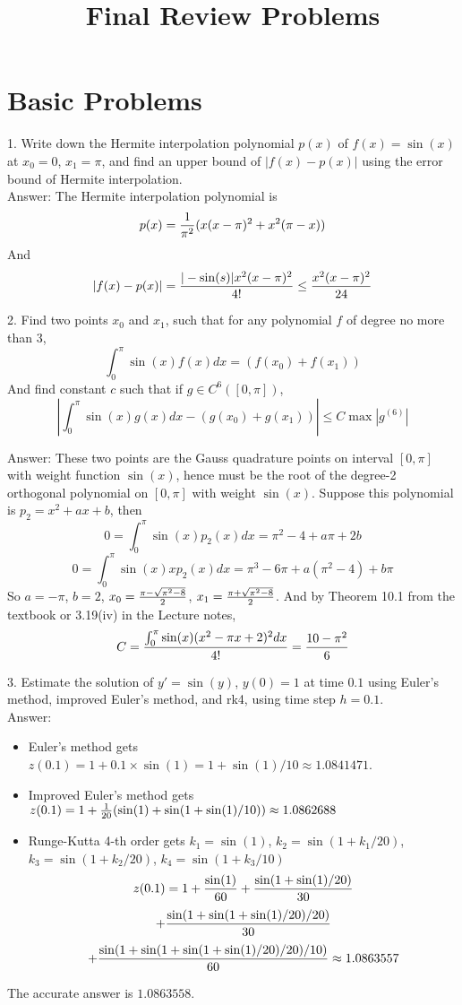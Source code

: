 \documentclass[20pt]{article} %
\title{Final Review Problems}
\theoremstyle{break}
\begin{document}
\maketitle


\section{Basic Problems}

1. Write down the Hermite interpolation polynomial $p(x)$ of $f(x)=\sin(x)$ at $x_0=0$, $x_1=\pi$, and find an upper bound of $|f(x)-p(x)|$ using the error bound of Hermite interpolation.\\

Answer: The Hermite interpolation polynomial is
\[p(x)={1\over \pi^2}(x(x-\pi)^2+x^2(\pi-x))\]
And
\[|f(x)-p(x)|={|-\sin(s)|x^2(x-\pi)^2\over 4!}\leq{x^2(x-\pi)^2\over 24}\]

2. Find two points $x_0$ and $x_1$, such that for any polynomial $f$ of degree no more than $3$,
\[\int_0^\pi\sin(x)f(x)dx=(f(x_0)+f(x_1))\]
And find constant $c$ such that if $g\in C^6([0, \pi])$,
\[|\int_0^\pi\sin(x)g(x)dx-(g(x_0)+g(x_1))|\leq C\max|g^{(6)}|\]

Answer: These two points are the Gauss quadrature points on interval $[0, \pi]$ with weight function $\sin(x)$, hence must be the root of the degree-2 orthogonal polynomial on $[0, \pi]$ with weight $\sin(x)$. Suppose this polynomial is $p_2=x^2+ax+b$, then
\[0=\int_0^\pi \sin(x)p_2(x)dx=\pi^2-4+a\pi+2b\]
\[0=\int_0^\pi \sin(x)xp_2(x)dx=\pi^3-6\pi+a(\pi^2-4)+b\pi\]
So $a=-\pi$, $b=2$, $x_0={\pi-\sqrt{\pi^2-8}\over 2}$, $x_1={\pi+\sqrt{\pi^2-8}\over 2}$.
And by Theorem 10.1 from the textbook or 3.19(iv) in the Lecture notes,
\[C={\int_0^\pi\sin(x)(x^2-\pi x+2)^2dx\over 4!}={10-\pi^2\over 6}\]

3. Estimate the solution of $y'=\sin(y)$, $y(0)=1$ at time $0.1$ using Euler's method, improved Euler's method, and rk4, using time step $h=0.1$. \\

Answer:
\begin{itemize}
\item Euler's method gets $z(0.1)=1+0.1\times\sin(1)=1+\sin(1)/10\approx 1.0841471$.
\item Improved Euler's method gets $z(0.1)=1+{1\over 20}(\sin(1)+\sin(1+\sin(1)/10))\approx 1.0862688$
\item Runge-Kutta 4-th order gets $k_1=\sin(1)$, $k_2=\sin(1+k_1/20)$, $k_3=\sin(1+k_2/20)$, $k_4=\sin(1+k_3/10)$
  \[z(0.1)=1+{\sin(1)\over 60}+{\sin(1+\sin(1)/20)\over 30}\]
  \[+{\sin(1+\sin(1+\sin(1)/20)/20)\over 30}\]
  \[+{\sin(1+\sin(1+\sin(1+\sin(1)/20)/20)/10)\over 60}\approx 1.0863557\]
\end{itemize}
The accurate answer is $1.0863558$.\\
\end{document}
